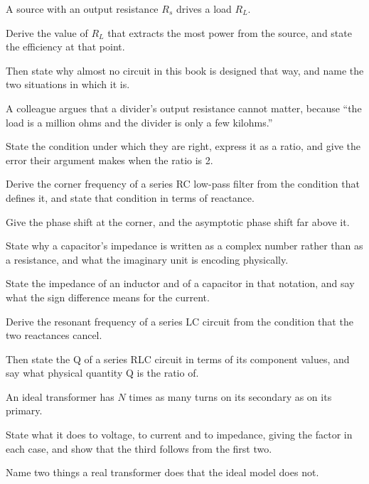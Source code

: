  A source with an output resistance $R_s$ drives a load $R_L$.

Derive the value of $R_L$ that extracts the most power from the source, and state the efficiency at that point.

Then state why almost no circuit in this book is designed that way, and name the two situations in which it is.

 A colleague argues that a divider's output resistance cannot matter, because ``the load is a million ohms and the divider is only a few kilohms.''

State the condition under which they are right, express it as a ratio, and give the error their argument makes when the ratio is 2.

\label{exb:q:2}

 Derive the corner frequency of a series RC low-pass filter from the condition that defines it, and state that condition in terms of reactance.

Give the phase shift at the corner, and the asymptotic phase shift far above it.

 State why a capacitor's impedance is written as a complex number rather than as a resistance, and what the imaginary unit is encoding physically.

State the impedance of an inductor and of a capacitor in that notation, and say what the sign difference means for the current.

 Derive the resonant frequency of a series LC circuit from the condition that the two reactances cancel.

Then state the Q of a series RLC circuit in terms of its component values, and say what physical quantity Q is the ratio of.

 An ideal transformer has $N$ times as many turns on its secondary as on its primary.

State what it does to voltage, to current and to impedance, giving the factor in each case, and show that the third follows from the first two.

Name two things a real transformer does that the ideal model does not.

\label{exb:q:3}

